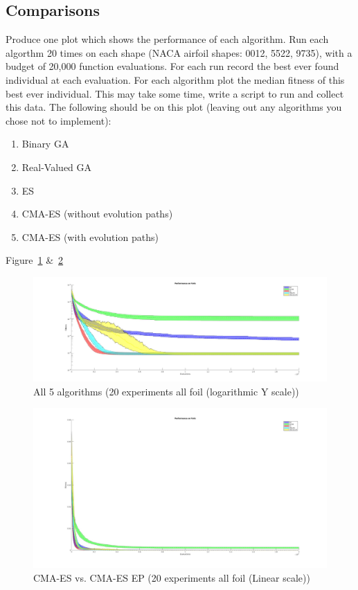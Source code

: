 \documentclass{article}
\begin{document}
\newpage
\subsection{Comparisons}
Produce one plot which shows the performance of each algorithm. Run each algorthm 20 times on each shape (NACA airfoil shapes: 0012, 5522, 9735), with a budget of 20,000 function evaluations. For each run record the best ever found individual at each evaluation. For each algorithm plot the median fitness of this best ever individual. This may take some time, write a script to run and collect this data. The following should be on this plot (leaving out any algorithms you chose not to implement):
\begin{enumerate}
	\item Binary GA
	\item Real-Valued GA
	\item ES
	\item CMA-ES (without evolution paths)
	\item CMA-ES (with evolution paths)
\end{enumerate}

\color{blue}
Figure~\ref{fig:11} \&~\ref{fig:12}
\color{black}
        \begin{figure}[ht!]
            \centering
            \includegraphics[width=1.0\linewidth]{output_y_log.jpg}
            \caption{All 5 algorithms (20 experiments all foil (logarithmic Y scale))\label{fig:11}}
        \end{figure}
        \begin{figure}[ht!]
            \centering
            \includegraphics[width=1.0\linewidth]{outputjpeg.jpg}
            \caption{CMA-ES vs. CMA-ES EP (20 experiments all foil (Linear scale)) \label{fig:12}}
        \end{figure}
\end{document}
